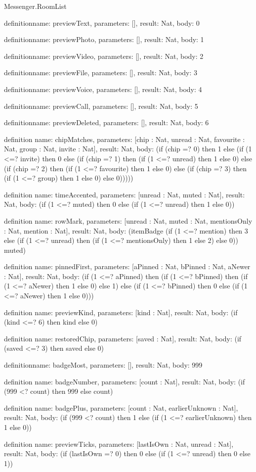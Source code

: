 \begin{lexlean}{Messenger.RoomList}
\begin{semanticmodule}
definition{name: previewText, parameters: [], result: Nat, body: 0}

definition{name: previewPhoto, parameters: [], result: Nat, body: 1}

definition{name: previewVideo, parameters: [], result: Nat, body: 2}

definition{name: previewFile, parameters: [], result: Nat, body: 3}

definition{name: previewVoice, parameters: [], result: Nat, body: 4}

definition{name: previewCall, parameters: [], result: Nat, body: 5}

definition{name: previewDeleted, parameters: [], result: Nat, body: 6}

definition{
  name: chipMatches,
  parameters: [chip : Nat, unread : Nat, favourite : Nat, group : Nat, invite : Nat],
  result: Nat,
  body: (if (chip =? 0) then 1 else (if (1 <=? invite) then 0 else (if (chip =? 1) then (if (1 <=? unread) then 1 else 0) else (if (chip =? 2) then (if (1 <=? favourite) then 1 else 0) else (if (chip =? 3) then (if (1 <=? group) then 1 else 0) else 0)))))
}

definition{
  name: timeAccented,
  parameters: [unread : Nat, muted : Nat],
  result: Nat,
  body: (if (1 <=? muted) then 0 else (if (1 <=? unread) then 1 else 0))
}

definition{
  name: rowMark,
  parameters: [unread : Nat, muted : Nat, mentionsOnly : Nat, mention : Nat],
  result: Nat,
  body: (itemBadge (if (1 <=? mention) then 3 else (if (1 <=? unread) then (if (1 <=? mentionsOnly) then 1 else 2) else 0)) muted)
}

definition{
  name: pinnedFirst,
  parameters: [aPinned : Nat, bPinned : Nat, aNewer : Nat],
  result: Nat,
  body: (if (1 <=? aPinned) then (if (1 <=? bPinned) then (if (1 <=? aNewer) then 1 else 0) else 1) else (if (1 <=? bPinned) then 0 else (if (1 <=? aNewer) then 1 else 0)))
}

definition{
  name: previewKind,
  parameters: [kind : Nat],
  result: Nat,
  body: (if (kind <=? 6) then kind else 0)
}

definition{
  name: restoredChip,
  parameters: [saved : Nat],
  result: Nat,
  body: (if (saved <=? 3) then saved else 0)
}

definition{name: badgeMost, parameters: [], result: Nat, body: 999}

definition{
  name: badgeNumber,
  parameters: [count : Nat],
  result: Nat,
  body: (if (999 <? count) then 999 else count)
}

definition{
  name: badgePlus,
  parameters: [count : Nat, earlierUnknown : Nat],
  result: Nat,
  body: (if (999 <? count) then 1 else (if (1 <=? earlierUnknown) then 1 else 0))
}

definition{
  name: previewTicks,
  parameters: [lastIsOwn : Nat, unread : Nat],
  result: Nat,
  body: (if (lastIsOwn =? 0) then 0 else (if (1 <=? unread) then 0 else 1))
}
\end{semanticmodule}
\end{lexlean}
